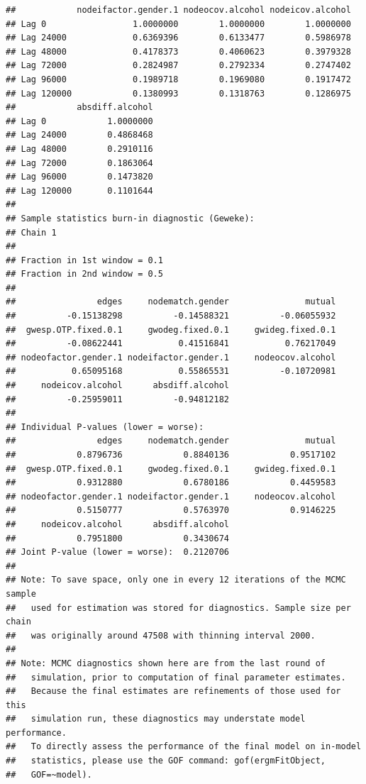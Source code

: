 \documentclass[
]{article}
\begin{document}
\begin{verbatim}
##            nodeifactor.gender.1 nodeocov.alcohol nodeicov.alcohol
## Lag 0                 1.0000000        1.0000000        1.0000000
## Lag 24000             0.6369396        0.6133477        0.5986978
## Lag 48000             0.4178373        0.4060623        0.3979328
## Lag 72000             0.2824987        0.2792334        0.2747402
## Lag 96000             0.1989718        0.1969080        0.1917472
## Lag 120000            0.1380993        0.1318763        0.1286975
##            absdiff.alcohol
## Lag 0            1.0000000
## Lag 24000        0.4868468
## Lag 48000        0.2910116
## Lag 72000        0.1863064
## Lag 96000        0.1473820
## Lag 120000       0.1101644
## 
## Sample statistics burn-in diagnostic (Geweke):
## Chain 1 
## 
## Fraction in 1st window = 0.1
## Fraction in 2nd window = 0.5 
## 
##                edges     nodematch.gender               mutual 
##          -0.15138298          -0.14588321          -0.06055932 
##  gwesp.OTP.fixed.0.1     gwodeg.fixed.0.1     gwideg.fixed.0.1 
##          -0.08622441           0.41516841           0.76217049 
## nodeofactor.gender.1 nodeifactor.gender.1     nodeocov.alcohol 
##           0.65095168           0.55865531          -0.10720981 
##     nodeicov.alcohol      absdiff.alcohol 
##          -0.25959011          -0.94812182 
## 
## Individual P-values (lower = worse):
##                edges     nodematch.gender               mutual 
##            0.8796736            0.8840136            0.9517102 
##  gwesp.OTP.fixed.0.1     gwodeg.fixed.0.1     gwideg.fixed.0.1 
##            0.9312880            0.6780186            0.4459583 
## nodeofactor.gender.1 nodeifactor.gender.1     nodeocov.alcohol 
##            0.5150777            0.5763970            0.9146225 
##     nodeicov.alcohol      absdiff.alcohol 
##            0.7951800            0.3430674 
## Joint P-value (lower = worse):  0.2120706 
## 
## Note: To save space, only one in every 12 iterations of the MCMC sample
##   used for estimation was stored for diagnostics. Sample size per chain
##   was originally around 47508 with thinning interval 2000.
## 
## Note: MCMC diagnostics shown here are from the last round of
##   simulation, prior to computation of final parameter estimates.
##   Because the final estimates are refinements of those used for this
##   simulation run, these diagnostics may understate model performance.
##   To directly assess the performance of the final model on in-model
##   statistics, please use the GOF command: gof(ergmFitObject,
##   GOF=~model).
\end{verbatim}
\end{document}

